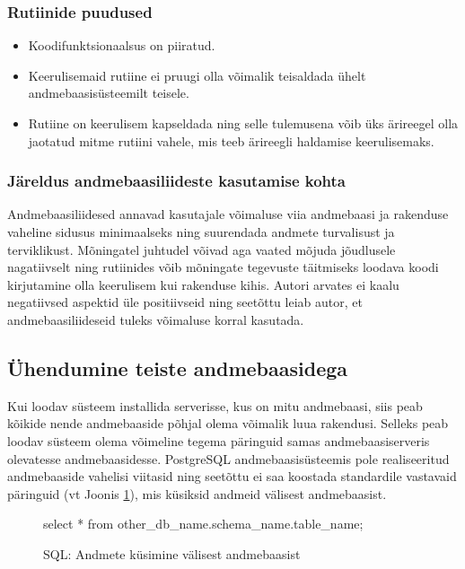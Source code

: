 \documentclass[a4paper,12pt]{article} %
\begin{document}
\subsubsection{Rutiinide puudused}
\begin{itemize}
\item Koodifunktsionaalsus on piiratud.
\item Keerulisemaid rutiine ei pruugi olla võimalik teisaldada ühelt andmebaasisüsteemilt teisele.
\item Rutiine on keerulisem kapseldada ning selle tulemusena võib üks ärireegel olla jaotatud mitme rutiini vahele, mis teeb ärireegli haldamise keerulisemaks.
\end{itemize}
\cite{StoredProcProsAndCons}

\subsubsection{Järeldus andmebaasiliideste kasutamise kohta}
Andmebaasiliidesed annavad kasutajale võimaluse viia andmebaasi ja rakenduse vaheline sidusus minimaalseks ning suurendada andmete turvalisust ja terviklikust. Mõningatel juhtudel võivad aga vaated mõjuda jõudlusele nagatiivselt ning rutiinides võib mõningate tegevuste täitmiseks loodava koodi kirjutamine olla keerulisem kui rakenduse kihis. Autori arvates ei kaalu negatiivsed aspektid üle positiivseid ning seetõttu leiab autor, et andmebaasiliideseid tuleks võimaluse korral kasutada.

\subsection{Ühendumine teiste andmebaasidega}
Kui loodav süsteem installida serverisse, kus on mitu andmebaasi, siis  peab kõikide nende andmebaaside põhjal olema võimalik luua rakendusi. Selleks peab loodav süsteem olema võimeline tegema päringuid samas andmebaasiserveris olevatesse andmebaasidesse. PostgreSQL andmebaasisüsteemis pole realiseeritud andmebaaside vahelisi viitasid ning seetõttu ei saa koostada standardile vastavaid päringuid (vt Joonis \ref{fig_sql_andmete_küsimine_välisest_andmebaasist}), mis küsiksid andmeid välisest andmebaasist.
\begin{figure}[H]
\centering
\begin{SQL}
select * from other_db_name.schema_name.table_name;
\end{SQL}
\caption{SQL: Andmete küsimine välisest andmebaasist}
\label{fig_sql_andmete_küsimine_välisest_andmebaasist}
\end{figure}
\end{document}
